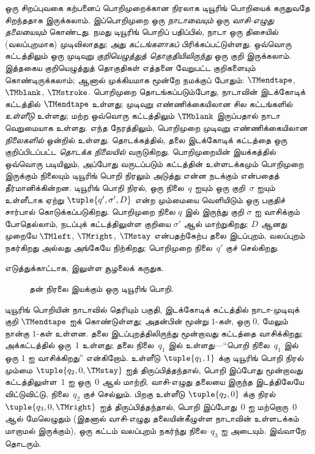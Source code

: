 \documentclass[../../../include/open-logic-section]{subfiles}
\begin{document}
\begin{explain}
ஒரு சிறப்புவகை கற்பனைப் பொறிமுறைக்கான நிரலாக டியூரிங் பொறியைக்
கருதுவதே சிறந்ததாக இருக்கலாம். இப்பொறிமுறை ஒரு \emph{நாடாவையும்}
ஒரு \emph{வாசி-எழுது தலையையும்} கொண்டது. நமது டியூரிங் பொறிப்
பதிப்பில், நாடா ஒரு திசையில் (வலப்புறமாக) முடிவிலாதது; அது
\emph{கட்டங்களாகப்} பிரிக்கப்பட்டுள்ளது. ஒவ்வொரு கட்டத்திலும் ஒரு
முடிவுறு \emph{குறியெழுத்துத் தொகுதியிலிருந்து} ஒரு குறி இருக்கலாம்.
இத்தகைய குறியெழுத்துத் தொகுதிகள் எத்தனை வேறுபட்ட குறிகளையும்
கொண்டிருக்கலாம்; ஆனால் முக்கியமாக மூன்றே நமக்குப் போதும்:
$\TMendtape$, $\TMblank$, $\TMstroke$. பொறிமுறை தொடங்கப்படும்போது,
நாடாவின் இடக்கோடிக் கட்டத்தில் $\TMendtape$ உள்ளது; முடிவுறு
எண்ணிக்கையிலான சில கட்டங்களில் \emph{உள்ளீடு} உள்ளது; மற்ற
ஒவ்வொரு கட்டத்திலும் $\TMblank$ இருப்பதால் நாடா வெறுமையாக உள்ளது.
எந்த நேரத்திலும், பொறிமுறை முடிவுறு எண்ணிக்கையிலான
\emph{நிலைகளில்} ஒன்றில் உள்ளது. தொடக்கத்தில், தலை இடக்கோடிக்
கட்டத்தை ஒரு குறிப்பிடப்பட்ட \emph{தொடக்க நிலையில்} வருடுகிறது.
பொறிமுறையின் இயக்கத்தில் ஒவ்வொரு படியிலும், அப்போது வருடப்படும்
கட்டத்தின் உள்ளடக்கமும் பொறிமுறை இருக்கும் நிலையும் டியூரிங் பொறி
நிரலும் அடுத்து என்ன நடக்கும் என்பதைத் தீர்மானிக்கின்றன. டியூரிங்
பொறி நிரல், ஒரு நிலை~$q$ ஐயும் ஒரு குறி~$\sigma$ ஐயும் உள்ளீடாக
ஏற்று $\tuple{q', \sigma', D}$ என்ற மும்மையை வெளியிடும் ஒரு
பகுதிச் சார்பால் கொடுக்கப்படுகிறது. பொறிமுறை நிலை $q$ இல் இருந்து
குறி $\sigma$ ஐ வாசிக்கும் போதெல்லாம், நடப்புக் கட்டத்திலுள்ள
குறியை $\sigma'$ ஆல் மாற்றுகிறது; $D$ ஆனது முறையே
$\TMleft$, $\TMright$, $\TMstay$ என்பதற்கேற்ப தலை இடப்புறம்,
வலப்புறம் நகர்கிறது அல்லது அங்கேயே நிற்கிறது; பொறிமுறை
நிலை~$q'$ குச் செல்கிறது.

எடுத்துக்காட்டாக,  இலுள்ள சூழலைக் கருதுக.
\begin{figure}
  \caption{தன் நிரலை இயக்கும் ஒரு டியூரிங் பொறி.}
\end{figure}
டியூரிங் பொறியின் நாடாவில் தெரியும் பகுதி, இடக்கோடிக் கட்டத்தில்
நாடா-முடிவுக் குறி $\TMendtape$ ஐக் கொண்டுள்ளது; அதன்பின் மூன்று
$1$-கள், ஒரு $0$, மேலும் நான்கு $1$-கள் உள்ளன. தலை இடப்புறத்திலிருந்து
மூன்றாவது கட்டத்தை வாசிக்கிறது; அக்கட்டத்தில் ஒரு~$1$ உள்ளது;
தலை நிலை~$q_1$ இல் உள்ளது---``பொறி நிலை~$q_1$ இல் ஒரு
$1$ ஐ வாசிக்கிறது'' என்கிறோம். உள்ளீடு $\tuple{q_1, 1}$ க்கு
டியூரிங் பொறி நிரல் மும்மை $\tuple{q_2, 0, \TMstay}$ ஐத்
திருப்பித்தந்தால், பொறி இப்போது மூன்றாவது கட்டத்திலுள்ள~$1$ ஐ
ஒரு~$0$ ஆல் மாற்றி, வாசி-எழுது தலையை இருந்த இடத்திலேயே விட்டுவிட்டு,
நிலை~$q_2$ குச் செல்லும். பிறகு உள்ளீடு $\tuple{q_2, 0}$ க்கு
நிரல் $\tuple{q_3, 0, \TMright}$ ஐத் திருப்பித்தந்தால், பொறி
இப்போது~$0$ ஐ மற்றொரு~$0$ ஆல் மேலெழுதும் (இதனால் வாசி-எழுது
தலையின்கீழுள்ள நாடாவின் உள்ளடக்கம் மாறாமல் இருக்கும்), ஒரு கட்டம்
வலப்புறம் நகர்ந்து நிலை~$q_3$ ஐ அடையும். இவ்வாறே தொடரும்.


\end{explain}
\end{document}
